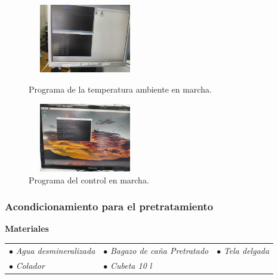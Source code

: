 \documentclass[12pt]{article}
\begin{document}
			\begin{figure}[H]
				\centering
				\begin{minipage}{0.46\textwidth}
					\centering
					\includegraphics[width=5cm, height=3cm]{imagenes/programa1} %
					\caption{Programa de la temperatura ambiente en marcha.}
					\label{progra 1}
				\end{minipage}
				\hfill
				\begin{minipage}{0.48\textwidth}
					\centering
					\includegraphics[width=5cm, height=3cm]{imagenes/programa2} %
					\caption{Programa del control en marcha.}
					\label{progra 2}
				\end{minipage}
			\end{figure}
			

			
			
			
			
			
			\subsubsection{Acondicionamiento para el pretratamiento}
			
			 \textbf{Materiales}
			\\[0.5em]
		
			\begin{tabular}{p{0.3\textwidth}p{}p{}}
				$\bullet$ \textit{Agua desmineralizada} & $\bullet$ \textit{ Bagazo de caña Pretratado} & $\bullet$ \textit{Tela delgada}  \\
			
				$\bullet$ \textit{Colador} & $\bullet$ \textit{Cubeta 10 l} & 
			\end{tabular}
			\\[0.5em]
			
\end{document}
